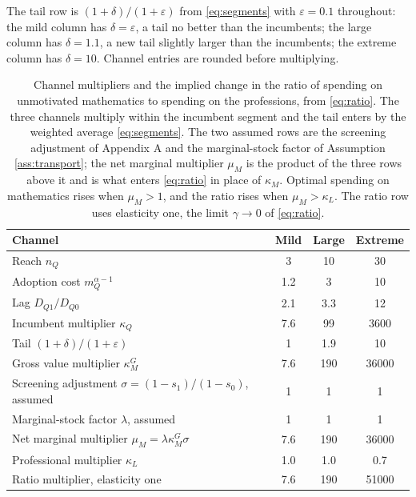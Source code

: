 \documentclass[11pt]{article}
\theoremstyle{definition}
\theoremstyle{remark}
\begin{document}
The tail row is $(1+\delta)/(1+\varepsilon)$ from \eqref{eq:segments} with $\varepsilon = 0.1$ throughout: the mild column has $\delta = \varepsilon$, a tail no better than the incumbents; the large column has $\delta = 1.1$, a new tail slightly larger than the incumbents; the extreme column has $\delta = 10$. Channel entries are rounded before multiplying.

\begin{table}[tbp]
\centering
\begin{tabular}{lccc}
\toprule
Channel & Mild & Large & Extreme \\
\midrule
Reach $n_Q$ & 3 & 10 & 30 \\
Adoption cost $m_Q^{\alpha-1}$ & 1.2 & 3 & 10 \\
Lag $D_{Q1}/D_{Q0}$ & 2.1 & 3.3 & 12 \\
\midrule
Incumbent multiplier $\kappa_Q$ & 7.6 & 99 & 3600 \\
Tail $(1+\delta)/(1+\varepsilon)$ & 1 & 1.9 & 10 \\
\midrule
Gross value multiplier $\kappa_M^G$ & 7.6 & 190 & 36000 \\
Screening adjustment $\sigma = (1-s_1)/(1-s_0)$, assumed & 1 & 1 & 1 \\
Marginal-stock factor $\lambda$, assumed & 1 & 1 & 1 \\
Net marginal multiplier $\mu_M = \lambda\kappa_M^G\sigma$ & 7.6 & 190 & 36000 \\
Professional multiplier $\kappa_L$ & 1.0 & 1.0 & 0.7 \\
\midrule
Ratio multiplier, elasticity one & 7.6 & 190 & 51000 \\
\bottomrule
\end{tabular}
\caption{Channel multipliers and the implied change in the ratio of spending on unmotivated mathematics to spending on the professions, from \eqref{eq:ratio}. The three channels multiply within the incumbent segment and the tail enters by the weighted average \eqref{eq:segments}. The two assumed rows are the screening adjustment of Appendix A and the marginal-stock factor of Assumption \ref{ass:transport}; the net marginal multiplier $\mu_M$ is the product of the three rows above it and is what enters \eqref{eq:ratio} in place of $\kappa_M$. Optimal spending on mathematics rises when $\mu_M > 1$, and the ratio rises when $\mu_M > \kappa_L$. The ratio row uses elasticity one, the limit $\gamma \to 0$ of \eqref{eq:ratio}.}
\label{tab:channels}
\end{table}
\end{document}
